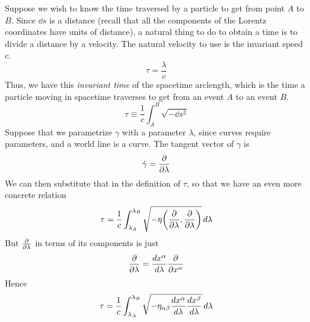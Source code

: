 		Suppose we wish to know the time traversed by a particle
		to get from point $A$ to $B$. Since $\dd{s}$ is a distance
		(recall that all the components of the Lorentz coordinates
		have units of distance), a natural thing to do to obtain a
		time is to divide a distance by a velocity. The natural
		velocity to use is the invariant speed $c$.
		\[
			\tau = \frac{\lambda}{c} 
		\]
		Thus, we have this \textit{invariant time} of the spacetime
		arclength, which is the time a particle moving 
		in spacetime traverses to get from an event $A$ to an event $B$.
		\[
			\tau \equiv \frac{1}{c} 
			\int_A^B \sqrt{-\dd{s^2}}
		\]
		Suppose that we parametrize $\gamma$ with a parameter $\lambda$,
		since curves require parameters, and a world line is a curve.
		The tangent vector of $\gamma$ is
		\[
			\dot\gamma = \pdv{}{\lambda} 
		\]
		We can then substitute that in the definition of $\tau$, so 
		that we have an even more concrete relation
		\[
			\tau = 
			\frac{1}{c}\int_{\lambda_A}^{\lambda_B} 
			\sqrt{
				-\eta\qty(
				\pdv{}{\lambda},
				\pdv{\lambda}
				)
			}
			\dd{\lambda}
		\]
		But $\pdv{}{\lambda}$ in terms of its components is just
		\[
			\pdv{}{\lambda} 
			=
			\dv{x^\alpha}{\lambda} 
			\pdv{}{x^\alpha} 
		\]
		Hence
		\begin{align*}
			\tau = 
			\frac{1}{c}\int_{\lambda_A}^{\lambda_B} 
			\sqrt{
				-
				\eta_{\alpha\beta}
				\dv{x^\alpha}{\lambda}
				\dv{x^\beta}{\lambda} 
			}
			\dd{\lambda}
		\end{align*}

